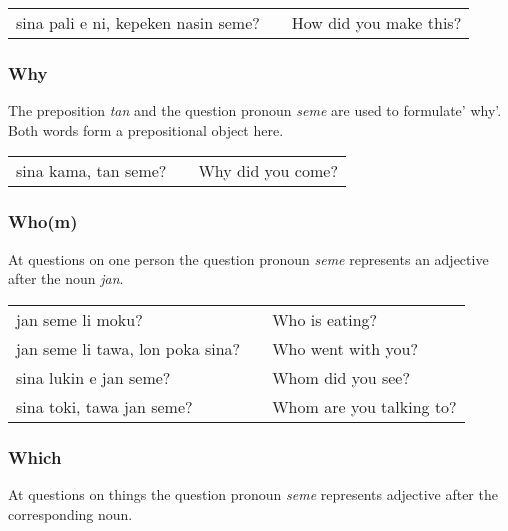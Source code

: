 \begin{supertabular}{p{5,5cm}|ll}
    sina pali e ni, kepeken nasin seme? &  & How did you make this? \\
\end{supertabular}

%
\subsubsection*{Why}
%
%
The preposition \textit{tan} and the question pronoun \textit{seme} are used to formulate' why'.
Both words form a prepositional object here.

\begin{supertabular}{p{5,5cm}|ll}
    sina kama, tan seme? &  & Why did you come? \\
\end{supertabular}

\subsubsection*{Who(m)}
%
%
At questions on one person the question pronoun \textit{seme} represents an adjective after the noun \textit{jan}.

\begin{supertabular}{p{5,5cm}|ll}
    jan seme li moku?                &  & Who is eating?           \\
    jan seme li tawa, lon poka sina? &  & Who went with you?       \\
    sina lukin e jan seme?           &  & Whom did you see?        \\
    sina toki, tawa jan seme?        &  & Whom are you talking to? \\
\end{supertabular}
%
\subsubsection*{Which}
%
%
At questions on things the question pronoun \textit{seme} represents adjective after the corresponding noun.

